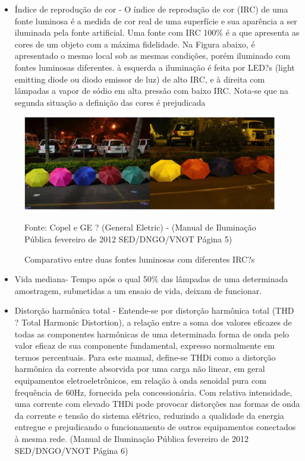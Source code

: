 \begin{itemize}
	\item \'Indice de reprodu\c{c}\~ao de cor - O \'indice de reprodu\c{c}\~ao de cor (IRC) de uma fonte luminosa \'e a medida de cor real de uma superf\'icie e sua apar\^encia a ser iluminada pela fonte artificial. Uma fonte com IRC 100\% \'e a que apresenta as cores de um objeto com a m\'axima fidelidade. Na Figura abaixo, \'e apresentado o mesmo local sob as mesmas condi\c{c}\~oes, por\'em iluminado com fontes luminosas diferentes. \`a esquerda a ilumina\c{c}\~ao \'e feita por LED?s (light emitting diode ou diodo emissor de luz) de alto IRC, e \`a direita com l\^ampadas a vapor de s\'odio em alta press\~ao com baixo IRC. Nota-se que na segunda situa\c{c}\~ao a defini\c{c}\~ao das cores \'e prejudicada
\end{itemize}

\begin{figure}[h!]
	 \centering
	\label{ComparativoDuasFontesLuminosas}
	 \includegraphics[keepaspectratio=true,scale=0.8]{figuras/ComparativoDuasFontesLuminosas.png}
	 \caption{Comparativo entre duas fontes luminosas com diferentes IRC?s}
	\small{Fonte: Copel e GE ? (General Eletric) - (Manual de Ilumina\c{c}\~ao P\'ublica fevereiro de 2012 SED/DNGO/VNOT P\'agina 5)}
\end{figure}

\begin{itemize}
        \item Vida mediana- Tempo ap\'os o qual 50\% das l\^ampadas de uma determinada amostragem, submetidas a um ensaio de vida, deixam de funcionar.
	\item Distor\c{c}\~ao harm\^onica total - Entende-se por distor\c{c}\~ao harm\^onica total (THD ? Total Harmonic Distortion), a rela\c{c}\~ao entre a soma dos valores eficazes de todas as componentes harm\^onicas de uma determinada forma de onda pelo valor eficaz de sua componente fundamental, expresso normalmente em termos percentuais. Para este manual, define-se THDi como a distor\c{c}\~ao harm\^onica da corrente absorvida por uma carga n\~ao linear, em geral equipamentos eletroeletr\^onicos, em rela\c{c}\~ao \`a onda senoidal pura com frequ\^encia de 60Hz, fornecida pela concession\'aria. Com relativa intensidade, uma corrente com elevado THDi pode provocar distor\c{c}\~oes nas formas de onda da corrente e tens\~ao do sistema el\'etrico, reduzindo a qualidade da energia entregue e prejudicando o funcionamento de outros equipamentos conectados \`a mesma rede. \cite{CopelParana}(Manual de Ilumina\c{c}\~ao P\'ublica fevereiro de 2012 SED/DNGO/VNOT P\'agina 6)
\end{itemize}


